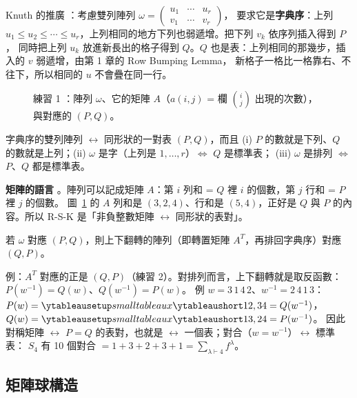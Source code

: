 Knuth 的推廣 ：考慮雙列陣列 $\omega=\left(\begin{smallmatrix}u_1&\cdots&u_r\\ v_1&\cdots&v_r\end{smallmatrix}\right)$，
要求它是\textbf{字典序}：上列 $u_1\le u_2\le\cdots\le u_r$，上列相同的地方下列也弱遞增。把下列 $v_k$ 依序列插入得到 $P$，
同時把上列 $u_k$ 放進新長出的格子得到 $Q$。$Q$ 也是表：上列相同的那幾步，插入的 $v$ 弱遞增，由第 1 章的 Row Bumping Lemma，
新格子一格比一格靠右、不往下，所以相同的 $u$ 不會疊在同一行。

\begin{figure}[H]
\centering
\FulArray
\caption{練習 1 ：陣列 $\omega$、它的矩陣 $A$（$a(i,j)$ = 欄 $\binom{i}{j}$ 出現的次數），與對應的 $(P,Q)$。}
\label{fig:f-array}
\end{figure}

\begin{thmbox}[R-S-K 定理 \fulref{p.40}]
字典序的雙列陣列 $\longleftrightarrow$ 同形狀的一對表 $(P,Q)$，而且
(i) $P$ 的數就是下列、$Q$ 的數就是上列；(ii) $\omega$ 是字（上列是 $1,\ldots,r$）$\iff$ $Q$ 是標準表；
(iii) $\omega$ 是排列 $\iff$ $P$、$Q$ 都是標準表。
\end{thmbox}

\textbf{矩陣的語言} 。陣列可以記成矩陣 $A$：第 $i$ 列和 = $Q$ 裡 $i$ 的個數，第 $j$ 行和 = $P$ 裡 $j$ 的個數。
圖~\ref{fig:f-array} 的 $A$ 列和是 $(3,2,4)$、行和是 $(5,4)$，正好是 $Q$ 與 $P$ 的內容。所以 R-S-K 是「非負整數矩陣 $\leftrightarrow$ 同形狀的表對」。

\begin{thmbox}
若 $\omega$ 對應 $(P,Q)$，則上下翻轉的陣列（即轉置矩陣 $A^{T}$，再排回字典序）對應 $(Q,P)$。
\end{thmbox}

例：$A^T$ 對應的正是 $(Q,P)$（練習 2）。對排列而言，上下翻轉就是取反函數：$P(w^{-1})=Q(w)$、$Q(w^{-1})=P(w)$。
例 $w=3\,1\,4\,2$、$w^{-1}=2\,4\,1\,3$：$P(w)=\yts{12,34}=Q(w^{-1})$，$Q(w)=\yts{13,24}=P(w^{-1})$。
因此對稱矩陣 $\leftrightarrow$ $P=Q$ 的表對，也就是 $\leftrightarrow$ 一個表；對合（$w=w^{-1}$）$\leftrightarrow$ 標準表：
$S_4$ 有 10 個對合 $=1+3+2+3+1=\sum_{\lambda\vdash 4}f^\lambda$。

\subsection{矩陣球構造}\label{sec:f-balls}

